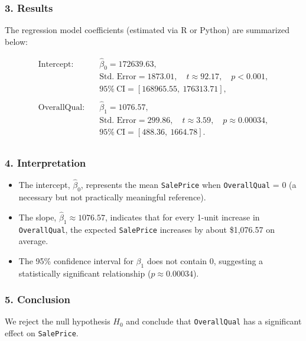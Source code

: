 \documentclass{article}
\begin{document}
\subsubsection*{3. Results}

The regression model coefficients (estimated via R or Python) are summarized below:

\[
\begin{aligned}
\text{Intercept}:\quad & \hat{\beta}_0 = 172639.63, \\
& \text{Std. Error} = 1873.01,\quad t \approx 92.17,\quad p < 0.001, \\
& 95\%\ \text{CI} = [168965.55,\ 176313.71],\\
\\
\text{OverallQual}:\quad & \hat{\beta}_1 = 1076.57, \\
& \text{Std. Error} = 299.86,\quad t \approx 3.59,\quad p \approx 0.00034, \\
& 95\%\ \text{CI} = [488.36,\ 1664.78].\\
\end{aligned}
\]

\subsubsection*{4. Interpretation}

\begin{itemize}
    \item The intercept, \(\hat{\beta}_0\), represents the mean \texttt{SalePrice} when \texttt{OverallQual} = 0 (a necessary but not practically meaningful reference).
    \item The slope, \(\hat{\beta}_1\approx 1076.57\), indicates that for every 1-unit increase in \texttt{OverallQual}, the expected \texttt{SalePrice} increases by about \$1{,}076.57 on average.
    \item The 95\% confidence interval for \(\beta_1\) does not contain 0, suggesting a statistically significant relationship (\(p \approx 0.00034\)).
\end{itemize}

\subsubsection*{5. Conclusion}
We reject the null hypothesis \(H_0\) and conclude that \texttt{OverallQual} has a significant effect on \texttt{SalePrice}.

\vspace{1em}
\end{document}
